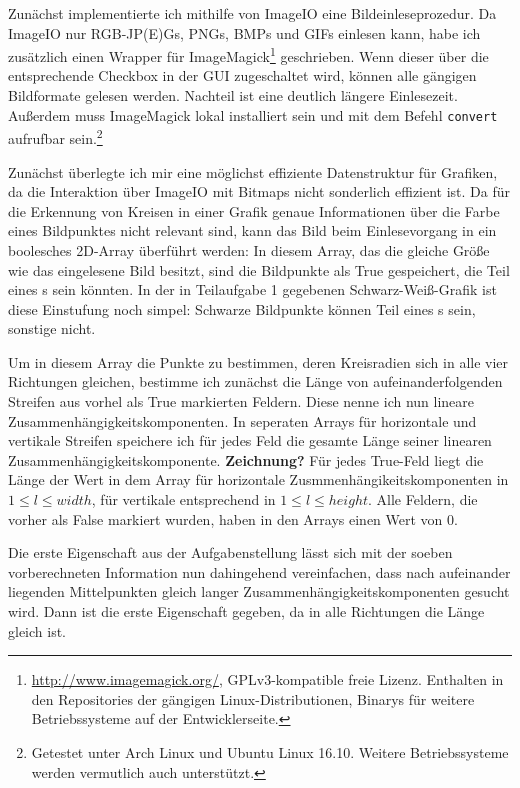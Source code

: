 Zunächst implementierte ich mithilfe von ImageIO eine Bildeinleseprozedur. Da ImageIO nur RGB-JP(E)Gs, PNGs, BMPs und GIFs einlesen kann, habe ich zusätzlich einen Wrapper für ImageMagick\footnote{\url{http://www.imagemagick.org/}, GPLv3-kompatible freie Lizenz. Enthalten in den Repositories der gängigen Linux-Distributionen, Binarys für weitere Betriebssysteme auf der Entwicklerseite.} geschrieben. Wenn dieser über die entsprechende Checkbox in der GUI zugeschaltet wird, können alle gängigen Bildformate gelesen werden. Nachteil ist eine deutlich längere Einlesezeit. Außerdem muss ImageMagick lokal installiert sein und mit dem Befehl \texttt{convert} aufrufbar sein.\footnote{Getestet unter Arch Linux und Ubuntu Linux 16.10. Weitere Betriebssysteme werden vermutlich auch unterstützt.}

Zunächst überlegte ich mir eine möglichst effiziente Datenstruktur für Grafiken, da die Interaktion über ImageIO mit Bitmaps nicht sonderlich effizient ist. Da für die Erkennung von Kreisen in einer Grafik genaue Informationen über die Farbe eines Bildpunktes nicht relevant sind, kann das Bild beim Einlesevorgang in ein boolesches 2D-Array überführt werden: In diesem Array, das die gleiche Größe wie das eingelesene Bild besitzt, sind die Bildpunkte als True gespeichert, die Teil eines \task{}s sein könnten. In der in Teilaufgabe 1 gegebenen Schwarz-Weiß-Grafik ist diese Einstufung noch simpel: Schwarze Bildpunkte können Teil eines \task{}s sein, sonstige nicht.

Um in diesem Array die Punkte zu bestimmen, deren Kreisradien sich in alle vier Richtungen gleichen, bestimme ich zunächst die Länge von aufeinanderfolgenden Streifen aus vorhel als True markierten Feldern. Diese nenne ich nun lineare Zusammenhängigkeitskomponenten. In seperaten Arrays für horizontale und vertikale Streifen speichere ich für jedes Feld die gesamte Länge seiner linearen Zusammenhängigkeitskomponente. \textbf{Zeichnung?} 
Für jedes True-Feld liegt die Länge der Wert in dem Array für horizontale Zusmmenhängikeitskomponenten in \(1 \le l \le width\), für vertikale entsprechend in \(1 \le l \le height\). Alle Feldern, die vorher als False markiert wurden, haben in den Arrays einen Wert von 0. 

Die erste Eigenschaft aus der Aufgabenstellung lässt sich mit der soeben vorberechneten Information nun dahingehend vereinfachen, dass nach aufeinander liegenden Mittelpunkten gleich langer Zusammenhängigkeitskomponenten gesucht wird. Dann ist die erste Eigenschaft gegeben, da in alle Richtungen die Länge gleich ist.

